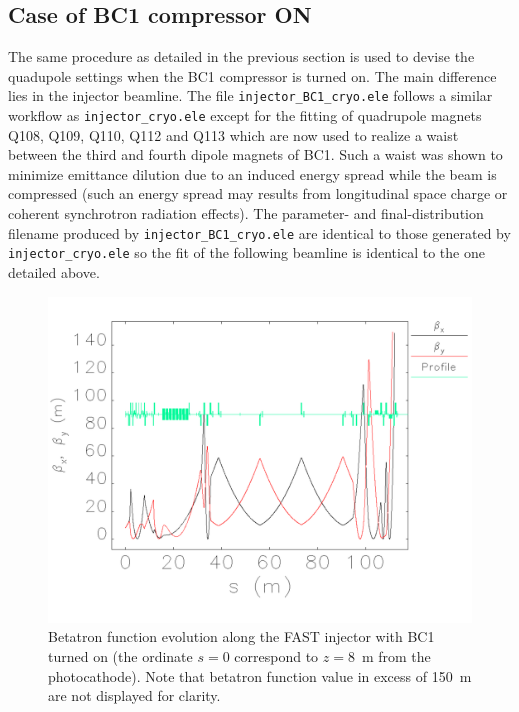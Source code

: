 \documentclass[notitlepage,twocolumn,nofootinbib,showpacs,preprintnumbers,superscriptaddress,amsmath,amssymb]{revtex4-1}
\begin{document}
\subsection{Case of BC1 compressor ON}
%
The same procedure as detailed in the previous section is used to devise the quadupole settings when the BC1 compressor is turned on. The main difference lies in the injector beamline. The file {\tt  injector\_BC1\_cryo.ele} follows a similar workflow as {\tt  injector\_cryo.ele} except for the fitting of quadrupole magnets Q108, Q109, Q110, Q112 and Q113 which are now used to realize a waist between the third and fourth dipole magnets of BC1. Such a waist was shown to minimize emittance dilution due to an induced energy spread while the beam is compressed (such an energy spread may results from longitudinal space charge or coherent synchrotron radiation effects). The parameter- and final-distribution filename produced by {\tt  injector\_BC1\_cryo.ele}  are identical to those generated by {\tt  injector\_cryo.ele}  so the fit of the following beamline is identical to the one detailed above. 
%
\begin{figure}[hhhh!!!!!!!!!!!!!!!]
\begin{center}
 \includegraphics[width=0.95\linewidth]{injectortodump_twissbc.pdf}
\caption{Betatron function evolution along the FAST injector with BC1 turned on (the ordinate $s=0$ correspond to $z=8$~m from the photocathode). Note that betatron function value in excess of 150~m are not displayed for clarity.\label{CS1bc} }
\end{center}
\end{figure}
\end{document}
